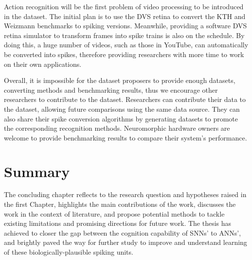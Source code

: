 Action recognition will be the first problem of video processing to be introduced in the dataset.
The initial plan is to use the DVS retina to convert the KTH and Weizmann benchmarks to spiking versions.
Meanwhile, providing a software DVS retina simulator to transform frames into spike trains is also on the schedule.
By doing this, a huge number of videos, such as those in YouTube, can automatically be converted into spikes, therefore providing researchers with more time to work on their own applications.

Overall, it is impossible for the dataset proposers to provide enough datasets, converting methods and benchmarking results, thus we encourage other researchers to contribute to the dataset.
Researchers can contribute their data to the dataset, allowing future comparisons using the same data source.
They can also share their spike conversion algorithms by generating datasets to promote the corresponding recognition methods.
Neuromorphic hardware owners are welcome to provide benchmarking results to compare their system's performance.
\section{Summary}

The concluding chapter reflects to the research question and hypotheses raised in the first Chapter, highlights the main contributions of the work, discusses the work in the context of literature, and propose potential methods to tackle existing limitations and promising directions for future work.
The thesis has achieved to closer the gap between the cognition capability of SNNs' to ANNs', and brightly paved the way for further study to improve and understand learning of these biologically-plausible spiking units.